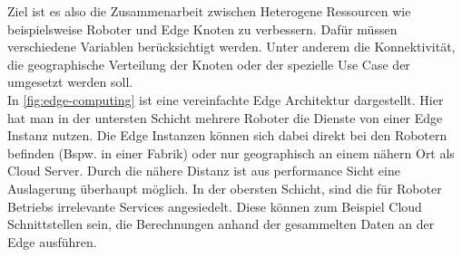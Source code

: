 Ziel ist es also die Zusammenarbeit zwischen Heterogene Ressourcen wie beispielsweise Roboter und Edge Knoten zu verbessern. Dafür müssen verschiedene Variablen berücksichtigt werden. Unter anderem die Konnektivität, die geographische Verteilung der Knoten oder der spezielle Use Case der umgesetzt werden soll.\\
In \ref{fig:edge-computing} ist eine vereinfachte Edge Architektur dargestellt. Hier hat man in der untersten Schicht mehrere Roboter die Dienste von einer Edge Instanz nutzen. Die Edge Instanzen können sich dabei direkt bei den Robotern befinden (Bspw. in einer Fabrik) oder nur geographisch an einem nähern Ort als Cloud Server. Durch die nähere Distanz ist aus performance Sicht eine Auslagerung überhaupt möglich. In der obersten Schicht, sind die für Roboter Betriebs irrelevante Services angesiedelt. Diese können zum Beispiel Cloud Schnittstellen sein, die Berechnungen anhand der gesammelten Daten an der Edge ausführen.
